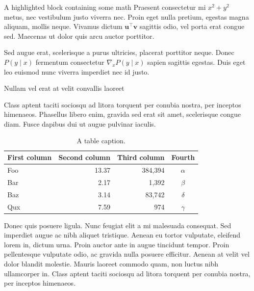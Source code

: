 \documentclass[final]{beamer}
\newlength{\colwidth}
\begin{document}
\begin{frame}[t]
\begin{columns}[t]
\begin{column}{\colwidth}
\begin{exampleblock}{A highlighted block containing some math}
    Praesent consectetur mi $x^2 + y^2$ metus, nec vestibulum justo viverra
    nec. Proin eget nulla pretium, egestas magna aliquam, mollis neque. Vivamus
    dictum $\mathbf{u}^\intercal\mathbf{v}$ sagittis odio, vel porta erat
    congue sed. Maecenas ut dolor quis arcu auctor porttitor.


    Sed augue erat, scelerisque a purus ultricies, placerat porttitor neque.
    Donec $P(y \mid x)$ fermentum consectetur $\nabla_x P(y \mid x)$ sapien
    sagittis egestas. Duis eget leo euismod nunc viverra imperdiet nec id
    justo.

  \end{exampleblock}

  \begin{block}{Nullam vel erat at velit convallis laoreet}

    Class aptent taciti sociosqu ad litora torquent per conubia nostra, per
    inceptos himenaeos. Phasellus libero enim, gravida sed erat sit amet,
    scelerisque congue diam. Fusce dapibus dui ut augue pulvinar iaculis.

    \begin{table}
      \centering
      \begin{tabular}{l r r c}
        \toprule
        \textbf{First column} & \textbf{Second column} & \textbf{Third column} & \textbf{Fourth} \\
        \midrule
        Foo & 13.37 & 384,394 & $\alpha$ \\
        Bar & 2.17 & 1,392 & $\beta$ \\
        Baz & 3.14 & 83,742 & $\delta$ \\
        Qux & 7.59 & 974 & $\gamma$ \\
        \bottomrule
      \end{tabular}
      \caption{A table caption.}
    \end{table}

    Donec quis posuere ligula. Nunc feugiat elit a mi malesuada consequat. Sed
    imperdiet augue ac nibh aliquet tristique. Aenean eu tortor vulputate,
    eleifend lorem in, dictum urna. Proin auctor ante in augue tincidunt
    tempor. Proin pellentesque vulputate odio, ac gravida nulla posuere
    efficitur. Aenean at velit vel dolor blandit molestie. Mauris laoreet
    commodo quam, non luctus nibh ullamcorper in. Class aptent taciti sociosqu
    ad litora torquent per conubia nostra, per inceptos himenaeos.


\end{block}
\end{column}
\end{columns}
\end{frame}
\end{document}

